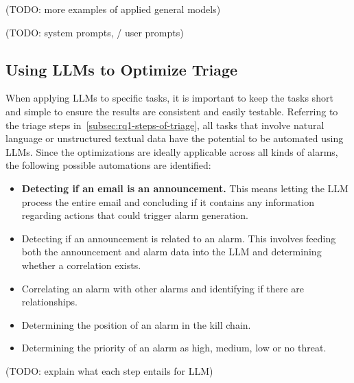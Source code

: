 (TODO: more examples of applied general models) %

(TODO: system prompts, / user prompts) %

\subsection{Using LLMs to Optimize Triage}
\label{subsec:rq1-llms-in-context}

When applying LLMs to specific tasks, it is important to keep the tasks short and simple to ensure the results are
consistent and easily testable.
Referring to the triage steps in\ \ref{subsec:rq1-steps-of-triage}, all tasks that involve natural language or
unstructured textual data have the potential to be automated using LLMs.
Since the optimizations are ideally applicable across all kinds of alarms, the following possible automations are
identified:
\begin{itemize}
    \item \textbf{Detecting if an email is an announcement.}
    This means letting the LLM process the entire email and concluding if it contains any information regarding actions
    that could trigger alarm generation.
    \item Detecting if an announcement is related to an alarm.
    This involves feeding both the announcement and alarm data into the LLM and determining whether a correlation
    exists.
    \item Correlating an alarm with other alarms and identifying if there are relationships.
    \item Determining the position of an alarm in the kill chain.
    \item Determining the priority of an alarm as high, medium, low or no threat.
\end{itemize}

(TODO: explain what each step entails for LLM) %
